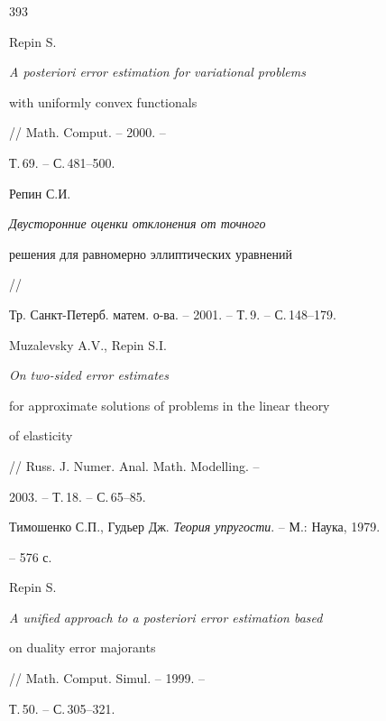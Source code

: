 \begin{thebibliography}{393}


Repin S. {\em A posteriori error estimation for variational problems


with uniformly convex functionals} // Math. Comput. -- 2000. --


Т.\,69. -- С.\,481--500.







Репин С.И. {\em Двусторонние оценки отклонения от точного


решения для равномерно эллиптических уравнений} //


Тр. Санкт-Петерб. матем. о-ва. -- 2001. -- Т.\,9. -- С.\,148--179.







Muzalevsky A.V., Repin S.I. {\em On two-sided error estimates


for approximate solutions of problems in the linear theory


of elasticity} // Russ. J. Numer. Anal. Math. Modelling. --


2003. -- Т.\,18. -- С.\,65--85.







Тимошенко С.П., Гудьер Дж. {\em Теория упругости}. -- М.: Наука, 1979.


-- 576 с.







Repin S. {\em A unified approach to a posteriori error estimation based 


on duality error majorants} // Math. Comput. Simul. -- 1999. --


Т.\,50. -- С.\,305--321.








\end{thebibliography}





\vskip 2cm







